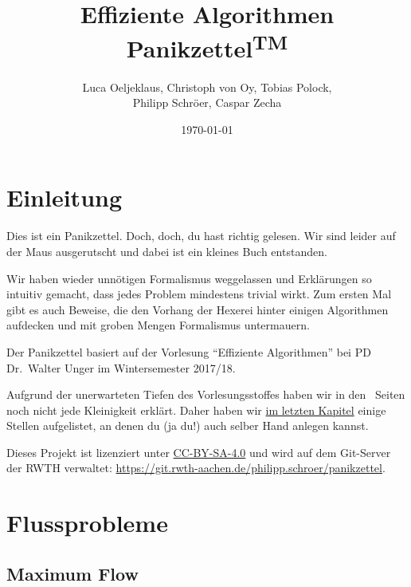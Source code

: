 \documentclass{panikzettel}
\title{Effiziente Algorithmen Panikzettel\textsuperscript{\footnotesize TM}}
\author{Luca Oeljeklaus, Christoph von Oy, Tobias Polock, \\Philipp Schröer, Caspar Zecha}
\date{\today}
\begin{document}
\maketitle

\tableofcontents

\section{Einleitung}

Dies ist ein Panikzettel. Doch, doch, du hast richtig gelesen. Wir sind leider auf der Maus ausgerutscht und dabei ist ein kleines Buch entstanden.

Wir haben wieder unnötigen Formalismus weggelassen und Erklärungen so intuitiv gemacht, dass jedes Problem mindestens trivial wirkt.
Zum ersten Mal gibt es auch Beweise, die den Vorhang der Hexerei hinter einigen Algorithmen aufdecken und mit groben Mengen Formalismus untermauern.

Der Panikzettel basiert auf der Vorlesung ``Effiziente Algorithmen'' bei PD Dr.\ Walter Unger im Wintersemester 2017/18.

Aufgrund der unerwarteten Tiefen des Vorlesungsstoffes haben wir in den~\pageref{ende} Seiten noch nicht jede Kleinigkeit erklärt. Daher haben wir \hyperref[sec:merge-requests]{im letzten Kapitel} einige Stellen aufgelistet, an denen du (ja du!) auch selber Hand anlegen kannst.

Dieses Projekt ist lizenziert unter \href{https://creativecommons.org/licenses/by-sa/4.0/}{CC-BY-SA-4.0} und wird auf dem Git-Server der RWTH verwaltet: \url{https://git.rwth-aachen.de/philipp.schroer/panikzettel}.

\newpage
\section{Flussprobleme}

\subsection{Maximum Flow}
\end{document}
